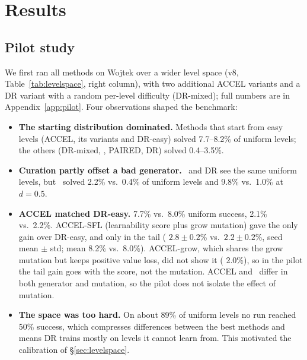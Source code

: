 \section{Results}
\label{sec:results}


\subsection{Pilot study}
\label{sec:pilot}
We first ran all methods on Wojtek over a wider level space (v8,
Table~\ref{tab:levelspace}, right column), with two additional ACCEL
variants and a DR variant with a random per-level difficulty (DR-mixed);
full numbers are in Appendix~\ref{app:pilot}. Four observations shaped the
benchmark:
\begin{itemize}
  \item \textbf{The starting distribution dominated.} Methods that start
    from easy levels (ACCEL, its variants and DR-easy) solved 7.7--8.2\% of
    uniform levels; the others (DR-mixed, \plr, PAIRED, DR) solved
    0.4--3.5\%.
  \item \textbf{Curation partly offset a bad generator.} \plr\ and DR see the
    same uniform levels, but \plr\ solved 2.2\% vs.\ 0.4\% of uniform
    levels and 9.8\% vs.\ 1.0\% at $d=0.5$.
  \item \textbf{ACCEL matched DR-easy.} 7.7\% vs.\ 8.0\% uniform success,
     2.1\% vs.\ 2.2\%. ACCEL-SFL (learnability score plus grow
    mutation) gave the only gain over DR-easy, and only in the tail
    ( $2.8\pm0.2$\% vs.\ $2.2\pm0.2$\%, seed mean $\pm$ std;
    mean 8.2\% vs.\ 8.0\%). ACCEL-grow, which shares the grow mutation but
    keeps positive value loss, did not show it ( 2.0\%), so in
    the pilot the tail gain goes with the score, not the mutation. ACCEL
    and \plr\ differ in both generator and mutation, so the pilot does not
    isolate the effect of mutation.
  \item \textbf{The space was too hard.} On about 89\% of uniform levels no
    run reached 50\% success, which compresses differences between the
    best methods and means DR trains mostly on levels it cannot learn
    from. This motivated the calibration of \S\ref{sec:levelspace}.
\end{itemize}

